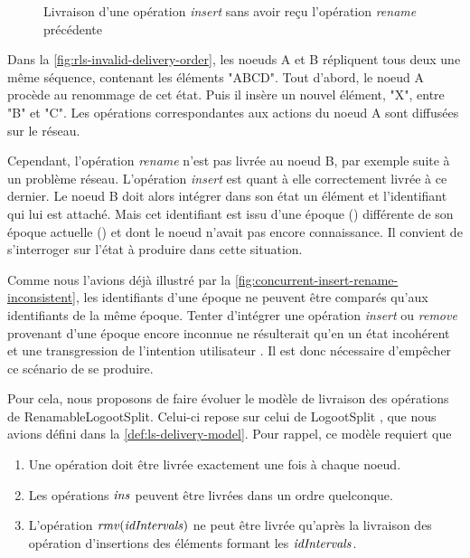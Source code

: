 \begin{figure}[!ht]
{
  }
  \caption{Livraison d'une opération \emph{insert} sans avoir reçu l'opération \emph{rename} précédente}
  \label{fig:rls-invalid-delivery-order}
\end{figure}

Dans la \autoref{fig:rls-invalid-delivery-order}, les noeuds A et B répliquent tous deux une même séquence, contenant les éléments "ABCD".
Tout d'abord, le noeud A procède au renommage de cet état.
Puis il insère un nouvel élément, "X", entre "B" et "C".
Les opérations correspondantes aux actions du noeud A sont diffusées sur le réseau.

Cependant, l'opération \emph{rename} n'est pas livrée au noeud B, par exemple suite à un problème réseau.
L'opération \emph{insert} est quant à elle correctement livrée à ce dernier.
Le noeud B doit alors intégrer dans son état un élément et l'identifiant qui lui est attaché.
Mais cet identifiant est issu d'une époque () différente de son époque actuelle () et dont le noeud n'avait pas encore connaissance.
Il convient de s'interroger sur l'état à produire dans cette situation.

Comme nous l'avions déjà illustré par la \autoref{fig:concurrent-insert-rename-inconsistent}, les identifiants d'une époque ne peuvent être comparés qu'aux identifiants de la même époque.
Tenter d'intégrer une opération \emph{insert} ou \emph{remove} provenant d'une époque encore inconnue ne résulterait qu'en un état incohérent et une transgression de l'intention utilisateur .
Il est donc nécessaire d'empêcher ce scénario de se produire.

Pour cela, nous proposons de faire évoluer le modèle de livraison des opérations de RenamableLogootSplit.
Celui-ci repose sur celui de LogootSplit \cf{}, que nous avions défini dans la \autoref{def:ls-delivery-model}.
Pour rappel, ce modèle requiert que
\begin{enumerate}
  \item Une opération doit être livrée exactement une fois à chaque noeud.
  \item Les opérations $\mathit{ins}$ peuvent être livrées dans un ordre quelconque.
  \item L'opération $\mathit{rmv}(\mathit{idIntervals})$ ne peut être livrée qu'après la livraison des opération d'insertions des éléments formant les $\mathit{idIntervals}$.
\end{enumerate}

